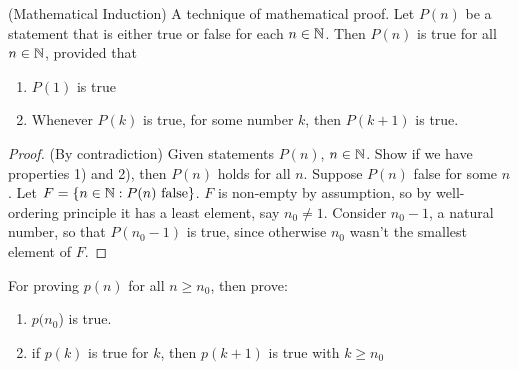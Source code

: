 \documentclass[12pt]{article}
\begin{document}
\begin{theorem}
  (Mathematical Induction) A technique of mathematical proof. Let $P(n)$ be a
  statement that is either true or false for each $n \in \mathbb{N}$. Then $P(n)$
  is true for all $n \in \mathbb{N}$, provided that
  \begin{enumerate}
  \item $P(1)$ is true
  \item Whenever $P(k)$ is true, for some number $k$, then $P(k+1)$ is true.
  \end{enumerate}
  \begin{proof}
    (By contradiction) Given statements $P(n)$, $n\in\mathbb{N}$. Show if we have
    properties 1) and 2), then $P(n)$ holds for all $n$. Suppose $P(n)$ false
    for some $n$. Let $F=\{n\in\mathbb{N} : P(n) \text{ false}\}$. $F$ is
    non-empty by assumption, so by well-ordering principle it has a least
    element, say $n_{0}\ne{}1$. Consider $n_{0}-1$, a natural number, so that
    $P(n_{0}-1)$ is true, since otherwise $n_{0}$ wasn't the smallest element
    of $F$.
  \end{proof}
  \begin{remark}
    For proving $p(n)$ for all $n \ge n_0$, then prove:
    \begin{enumerate}
    \item $p(n_0$) is true.
    \item if $p(k)$ is true for $k$, then $p(k + 1)$ is true with $k \ge n_0$
    \end{enumerate}
  \end{remark}
\end{theorem}
\end{document}
